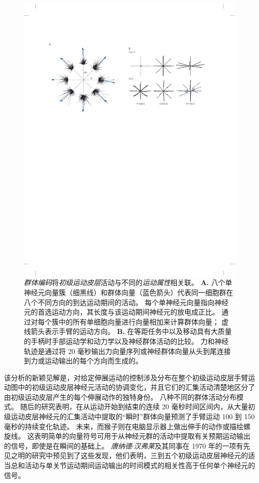 \begin{figure}[htbp]
	\centering
	\includegraphics[width=1.0\linewidth]{chap34/fig_34_22}
	\caption{\textit{群体编码}将\textit{初级运动皮层}活动与不同的\textit{运动属性}相关联。
		\textbf{A.} 八个单神经元向量簇（细黑线）和群体向量（蓝色箭头）代表同一细胞群在八个不同方向的到达运动期间的活动。
		每个单神经元向量指向神经元的首选运动方向，其长度与该运动期间神经元的放电成正比。
		通过对每个簇中的所有单细胞向量进行向量相加来计算群体向量；
		虚线箭头表示手臂的运动方向\cite{georgopoulos1983spatial}。
		\textbf{B.} 在等距任务中以及移动具有大质量的手柄时手部运动学和动力学以及神经群体活动的比较。
		力和神经轨迹是通过将 20 毫秒输出力向量序列或神经群体向量从头到尾连接到力或运动输出的每个方向而生成的。}
	\label{fig:34_22}
\end{figure}


该分析的新颖见解是，对给定伸展运动的控制涉及分布在整个初级运动皮层手臂运动图中的初级运动皮层神经元活动的协调变化，并且它们的汇集活动清楚地区分了由初级运动皮层产生的每个伸展动作的独特身份。
八种不同的群体活动分布模式。
随后的研究表明，在从运动开始到结束的连续 20 毫秒时间区间内，从大量初级运动皮层神经元的汇集活动中提取的“瞬时”群体向量预测了手臂运动 100 到 150 毫秒的持续变化轨迹。
未来，而猴子则在电脑显示器上做出伸手的动作或描绘螺旋线。
这表明简单的向量符号可用于从神经元群的活动中提取有关预期运动输出的信号，即使是在瞬间的基础上。
\textit{唐纳德$\cdot$汉弗莱}及其同事在 1970 年的一项有先见之明的研究中预见到了这些发现，他们表明，三到五个初级运动皮层神经元的适当总和活动与单关节运动期间运动输出的时间模式的相关性高于任何单个神经元的信号。


